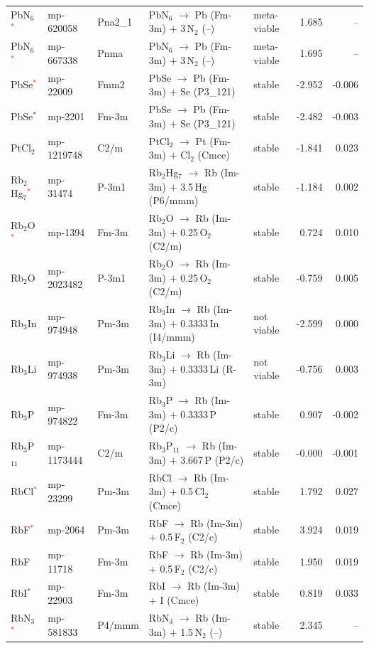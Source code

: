 \begin{longtable}{@{}ll l@{\hspace{4pt}} p{4.6cm} l@{\hspace{4pt}} rr@{}}
PbN$_{6}$\textcolor{red}{$^*$} & mp-620058 & Pna2\_1 & PbN$_{6}$ $\to$ Pb (Fm-3m) $+$ 3\,N$_{2}$ (--) & meta-viable & 1.685 & -- \\
PbN$_{6}$\textcolor{red}{$^*$} & mp-667338 & Pnma & PbN$_{6}$ $\to$ Pb (Fm-3m) $+$ 3\,N$_{2}$ (--) & meta-viable & 1.695 & -- \\
PbSe\textcolor{red}{$^*$} & mp-22009 & Fmm2 & PbSe $\to$ Pb (Fm-3m) $+$ Se (P3\_121) & stable & -2.952 & -0.006 \\
PbSe$^*$ & mp-2201 & Fm-3m & PbSe $\to$ Pb (Fm-3m) $+$ Se (P3\_121) & stable & -2.482 & -0.003 \\
PtCl$_{2}$ & mp-1219748 & C2/m & PtCl$_{2}$ $\to$ Pt (Fm-3m) $+$ Cl$_{2}$ (Cmce) & stable & -1.841 & 0.023 \\
Rb$_{2}$Hg$_{7}$\textcolor{red}{$^*$} & mp-31474 & P-3m1 & Rb$_{2}$Hg$_{7}$ $\to$ Rb (Im-3m) $+$ 3.5\,Hg (P6/mmm) & stable & -1.184 & 0.002 \\
Rb$_{2}$O\textcolor{red}{$^*$} & mp-1394 & Fm-3m & Rb$_{2}$O $\to$ Rb (Im-3m) $+$ 0.25\,O$_{2}$ (C2/m) & stable & 0.724 & 0.010 \\
Rb$_{2}$O & mp-2023482 & P-3m1 & Rb$_{2}$O $\to$ Rb (Im-3m) $+$ 0.25\,O$_{2}$ (C2/m) & stable & -0.759 & 0.005 \\
Rb$_{3}$In & mp-974948 & Pm-3m & Rb$_{3}$In $\to$ Rb (Im-3m) $+$ 0.3333\,In (I4/mmm) & not viable & -2.599 & 0.000 \\
Rb$_{3}$Li & mp-974938 & Pm-3m & Rb$_{3}$Li $\to$ Rb (Im-3m) $+$ 0.3333\,Li (R-3m) & not viable & -0.756 & 0.003 \\
Rb$_{3}$P & mp-974822 & Fm-3m & Rb$_{3}$P $\to$ Rb (Im-3m) $+$ 0.3333\,P (P2/c) & stable & 0.907 & -0.002 \\
Rb$_{3}$P$_{11}$ & mp-1173444 & C2/m & Rb$_{3}$P$_{11}$ $\to$ Rb (Im-3m) $+$ 3.667\,P (P2/c) & stable & -0.000 & -0.001 \\
RbCl\textcolor{red}{$^*$} & mp-23299 & Pm-3m & RbCl $\to$ Rb (Im-3m) $+$ 0.5\,Cl$_{2}$ (Cmce) & stable & 1.792 & 0.027 \\
RbF\textcolor{red}{$^*$} & mp-2064 & Pm-3m & RbF $\to$ Rb (Im-3m) $+$ 0.5\,F$_{2}$ (C2/c) & stable & 3.924 & 0.019 \\
RbF & mp-11718 & Fm-3m & RbF $\to$ Rb (Im-3m) $+$ 0.5\,F$_{2}$ (C2/c) & stable & 1.950 & 0.019 \\
RbI$^*$ & mp-22903 & Fm-3m & RbI $\to$ Rb (Im-3m) $+$ I (Cmce) & stable & 0.819 & 0.033 \\
RbN$_{3}$\textcolor{red}{$^*$} & mp-581833 & P4/mmm & RbN$_{3}$ $\to$ Rb (Im-3m) $+$ 1.5\,N$_{2}$ (--) & stable & 2.345 & -- \\

\end{longtable}
